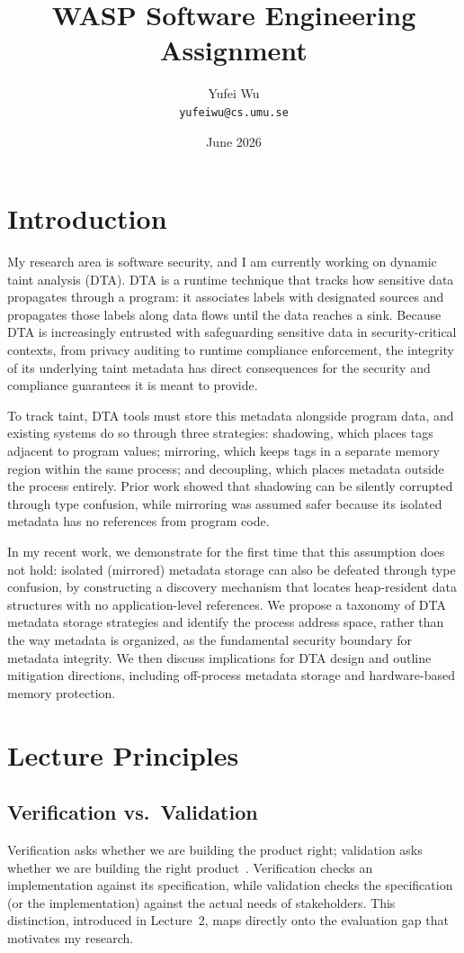\documentclass[a4paper,11pt]{article}
\title{WASP Software Engineering Assignment}
\author{Yufei Wu \\ \texttt{yufeiwu@cs.umu.se}}
\date{June 2026}
\theoremstyle{plain}
\begin{document}
\maketitle

\section{Introduction}
My research area is software security, and I am currently working on dynamic taint analysis (DTA). DTA is a runtime technique that tracks how sensitive data propagates through a program: it associates labels with designated sources and propagates those labels along data flows until the data reaches a sink. Because DTA is increasingly entrusted with safeguarding sensitive data in security-critical contexts, from privacy auditing to runtime compliance enforcement, the integrity of its underlying taint metadata has direct consequences for the security and compliance guarantees it is meant to provide.

To track taint, DTA tools must store this metadata alongside program data, and existing systems do so through three strategies: shadowing, which places tags adjacent to program values; mirroring, which keeps tags in a separate memory region within the same process; and decoupling, which places metadata outside the process entirely. Prior work showed that shadowing can be silently corrupted through type confusion, while mirroring was assumed safer because its isolated metadata has no references from program code.

In my recent work, we demonstrate for the first time that this assumption does not hold: isolated (mirrored) metadata storage can also be defeated through type confusion, by constructing a discovery mechanism that locates heap-resident data structures with no application-level references. We propose a taxonomy of DTA metadata storage strategies and identify the process address space, rather than the way metadata is organized, as the fundamental security boundary for metadata integrity. We then discuss implications for DTA design and outline mitigation directions, including off-process metadata storage and hardware-based memory protection.

\section{Lecture Principles}
\subsection{Verification vs.\ Validation}
Verification asks whether we are building the product right; validation asks whether we are building the right product~\cite{feldt2026qa}. Verification checks an implementation against its specification, while validation checks the specification (or the implementation) against the actual needs of stakeholders. This distinction, introduced in Lecture~2, maps directly onto the evaluation gap that motivates my research.
\end{document}
